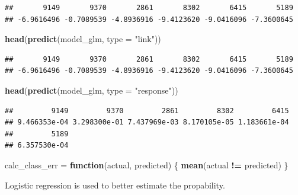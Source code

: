 \documentclass[]{report}
\newenvironment{Shaded}{\begin{snugshade}}{\end{snugshade}}
\newcommand{\KeywordTok}[1]{\textcolor[rgb]{0.13,0.29,0.53}{\textbf{#1}}}
\newcommand{\DataTypeTok}[1]{\textcolor[rgb]{0.13,0.29,0.53}{#1}}
\newcommand{\StringTok}[1]{\textcolor[rgb]{0.31,0.60,0.02}{#1}}
\newcommand{\CommentTok}[1]{\textcolor[rgb]{0.56,0.35,0.01}{\textit{#1}}}
\newcommand{\ControlFlowTok}[1]{\textcolor[rgb]{0.13,0.29,0.53}{\textbf{#1}}}
\newcommand{\OperatorTok}[1]{\textcolor[rgb]{0.81,0.36,0.00}{\textbf{#1}}}
\newcommand{\NormalTok}[1]{#1}
\begin{document}
\begin{verbatim}
##       9149       9370       2861       8302       6415       5189 
## -6.9616496 -0.7089539 -4.8936916 -9.4123620 -9.0416096 -7.3600645
\end{verbatim}

\begin{Shaded}
\begin{Highlighting}[]
\KeywordTok{head}\NormalTok{(}\KeywordTok{predict}\NormalTok{(model_glm, }\DataTypeTok{type =} \StringTok{"link"}\NormalTok{))}
\end{Highlighting}
\end{Shaded}

\begin{verbatim}
##       9149       9370       2861       8302       6415       5189 
## -6.9616496 -0.7089539 -4.8936916 -9.4123620 -9.0416096 -7.3600645
\end{verbatim}

\begin{Shaded}
\begin{Highlighting}[]
\KeywordTok{head}\NormalTok{(}\KeywordTok{predict}\NormalTok{(model_glm, }\DataTypeTok{type =} \StringTok{"response"}\NormalTok{))}
\end{Highlighting}
\end{Shaded}

\begin{verbatim}
##         9149         9370         2861         8302         6415 
## 9.466353e-04 3.298300e-01 7.437969e-03 8.170105e-05 1.183661e-04 
##         5189 
## 6.357530e-04
\end{verbatim}

\begin{Shaded}
\begin{Highlighting}[]
\NormalTok{calc_class_err =}\StringTok{ }\ControlFlowTok{function}\NormalTok{(actual, predicted) \{}
  \KeywordTok{mean}\NormalTok{(actual }\OperatorTok{!=}\StringTok{ }\NormalTok{predicted)}
\NormalTok{\}}
\end{Highlighting}
\end{Shaded}

\begin{Shaded}
\end{Shaded}

Logistic regression is used to better estimate the propability.
\end{document}
